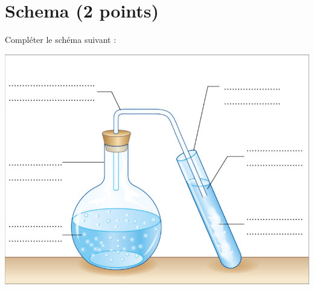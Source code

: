 \section{Schema (2 points)}\label{ex_schema}

Compléter le schéma suivant :

\begin{center}
	\includegraphics[scale=0.7]{img/gaz}
\end{center}